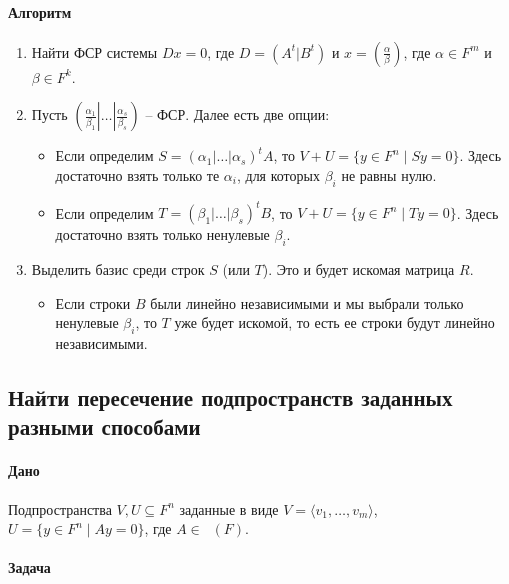 \documentclass{article}
\newcommand{\MatrixDim}[3]{\mathop{\mathrm{M}_{#2\,#3}}(#1)}
\begin{document}
\paragraph{Алгоритм}
\begin{enumerate}
\item Найти ФСР системы $D x = 0$, где $D = (A^t|B^t)$ и $x = \left(\frac{\alpha}{\beta}\right)$, где $\alpha \in F^{m}$ и $\beta\in F^{k}$.

\item Пусть $\left(\left.\left.\frac{\alpha_1}{\beta_1}\right|\ldots\right|\frac{\alpha_s}{\beta_s}\right)$ -- ФСР. Далее есть две опции:
\begin{itemize}
\item Если определим $S = (\alpha_1|\ldots|\alpha_s)^t A$, то $V+U = \{y\in F^{n}\mid Sy = 0\}$. Здесь достаточно взять только те $\alpha_i$, для которых $\beta_i$ не равны нулю.

\item Если определим $T = (\beta_1|\ldots|\beta_s)^t B$, то $V+U = \{y\in F^{n}\mid Ty = 0\}$. Здесь достаточно взять только ненулевые $\beta_i$.
\end{itemize}

\item Выделить базис среди строк $S$ (или $T$). Это и будет искомая матрица $R$.
\begin{itemize}
\item Если строки $B$ были линейно независимыми и мы выбрали только ненулевые $\beta_i$, то $T$ уже будет искомой, то есть ее строки будут линейно независимыми.
\end{itemize}
\end{enumerate}


\subsection{Найти пересечение подпространств заданных разными способами}

\paragraph{Дано}

Подпространства $V,U\subseteq F^{n}$ заданные в виде $V =\langle v_1,\ldots,v_m\rangle$, $U = \{y\in F^{n}\mid Ay = 0\}$, где $A\in \MatrixDim{F}{k}{n}$.

\paragraph{Задача}
\end{document}
